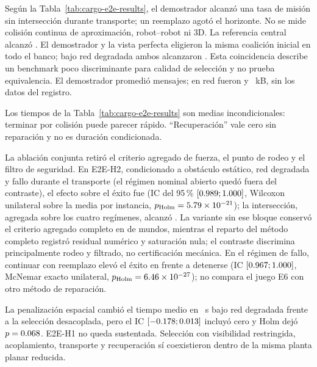 Según la Tabla~\ref{tab:cargo-e2e-results}, el demostrador alcanzó una tasa de misión \CargoEtwoESuccess{} sin intersección durante transporte; un reemplazo agotó el horizonte. No se mide colisión continua de aproximación, robot--robot ni 3D. La referencia central alcanzó \CargoEtwoECentralSuccess{}. El demostrador y la vista perfecta eligieron la misma coalición inicial en todo el banco; bajo red degradada ambos alcanzaron \CargoEtwoEDegradedSuccess{}. Esta coincidencia describe un benchmark poco discriminante para calidad de selección y no prueba equivalencia. El demostrador promedió \CargoEtwoEMessages{} mensajes; en red fueron \CargoEtwoEDegradedMessages{} y \CargoEtwoEDegradedKilobytes{}~kB, sin los datos del registro.

\begin{table}[!htbp]
  \centering
  \caption{Demostrador Cargo híbrido: resultados agregados de los seis tratamientos.}
  \label{tab:cargo-e2e-results}
  \small
  \resizebox{\textwidth}{!}{}
  \viuownsource
\end{table}

Los tiempos de la Tabla~\ref{tab:cargo-e2e-results} son medias incondicionales: terminar por colisión puede parecer rápido. ``Recuperación'' vale cero sin reparación y no es duración condicionada.

La ablación conjunta retiró el criterio agregado de fuerza, el punto de rodeo y el filtro de seguridad. En E2E-H2, condicionado a obstáculo estático, red degradada y fallo durante el transporte (el régimen nominal abierto quedó fuera del contraste), el efecto sobre el éxito fue \CargoEtwoEGuardEffect{} (IC del 95\,\% $[0.989;1.000]{}$, Wilcoxon unilateral sobre la media por instancia, $p_{\mathrm{Holm}}=5.79\times10^{-21}{}$); la intersección, agregada sobre los cuatro regímenes, alcanzó \CargoEtwoENoGuardCollision{}. La variante sin ese bloque conservó el criterio agregado completo en \CargoEtwoENoGuardCertified{} de \CargoEtwoEWorlds{} mundos, mientras el reparto del método completo registró residual numérico y saturación nula; el contraste discrimina principalmente rodeo y filtrado, no certificación mecánica. En el régimen de fallo, continuar con reemplazo elevó el éxito en \CargoEtwoERepairEffect{} frente a detenerse (IC $[0.967;1.000]{}$, McNemar exacto unilateral, $p_{\mathrm{Holm}}=6.46\times10^{-27}{}$); no compara el juego E6 con otro método de reparación.

La penalización espacial cambió el tiempo medio en \CargoEtwoETimingEffect{}~s bajo red degradada frente a la selección desacoplada, pero el IC $[-0.178;0.013]{}$ incluyó cero y Holm dejó $p=0.068{}$. E2E-H1 no queda sustentada. Selección con visibilidad restringida, acoplamiento, transporte y recuperación sí coexistieron dentro de la misma planta planar reducida.

